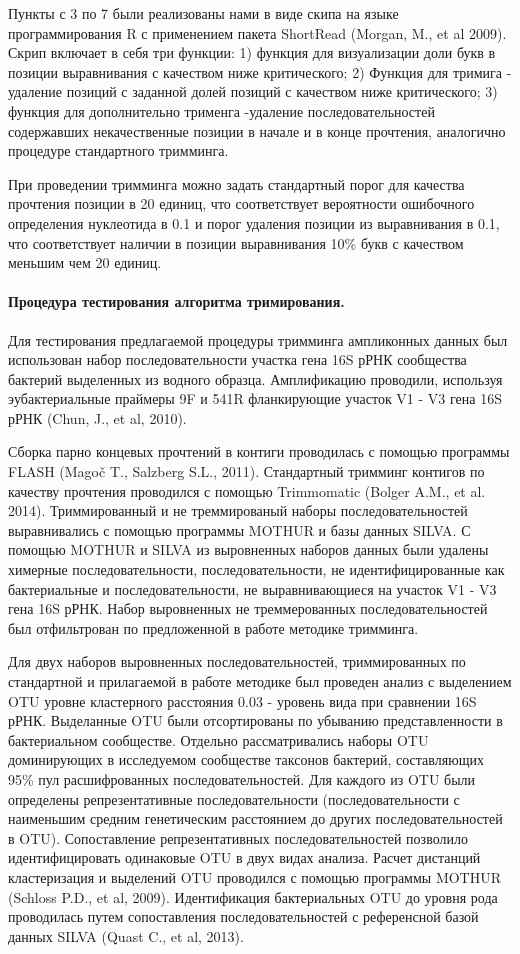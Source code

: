 \documentclass[a4paper,12pt,openany,final]{extreport}
\begin{document}
Пункты с 3 по 7 были реализованы нами в виде скипа на языке
программирования R с применением пакета ShortRead (Morgan, M., et al
2009). Скрип включает в себя три функции: 1) функция для визуализации
доли букв в позиции выравнивания с качеством ниже критического; 2)
Функция для тримига - удаление позиций с заданной долей позиций с
качеством ниже критического; 3) функция для дополнительно трименга
-удаление последовательностей содержавших некачественные позиции в
начале и в конце прочтения, аналогично процедуре стандартного тримминга.

При проведении тримминга можно задать стандартный порог для качества
прочтения позиции в 20 единиц, что соответствует вероятности ошибочного
определения нуклеотида в 0.1 и порог удаления позиции из выравнивания в
0.1, что соответствует наличии в позиции выравнивания 10\% букв с
качеством меньшим чем 20 единиц.

\paragraph{Процедура тестирования алгоритма тримирования.} Для
тестирования предлагаемой процедуры тримминга ампликонных данных был
использован набор последовательности участка гена 16S рРНК сообщества
бактерий выделенных из водного образца. Амплификацию проводили,
используя эубактериальные праймеры 9F и 541R фланкирующие участок V1 -
V3 гена 16S рРНК (Chun, J., et al, 2010).

Сборка парно концевых прочтений в контиги проводилась с помощью
программы FLASH (Magoč T., Salzberg S.L., 2011). Стандартный тримминг
контигов по качеству прочтения проводился с помощью Trimmomatic (Bolger
A.M., et al. 2014). Триммированный и не треммированый наборы
последовательностей выравнивались с помощью программы MOTHUR и базы
данных SILVA. С помощью MOTHUR и SILVA из выровненных наборов данных
были удалены химерные последовательности, последовательности, не
идентифицированные как бактериальные и последовательности, не
выравнивающиеся на участок V1 - V3 гена 16S рРНК. Набор выровненных не
треммерованных последовательностей был отфильтрован по предложенной в
работе методике тримминга.

Для двух наборов выровненных последовательностей, триммированных по
стандартной и прилагаемой в работе методике был проведен анализ с
выделением OTU уровне кластерного расстояния 0.03 - уровень вида при
сравнении 16S рРНК. Выделанные OTU были отсортированы по убыванию
представленности в бактериальном сообществе. Отдельно рассматривались
наборы OTU доминирующих в исследуемом сообществе таксонов бактерий,
составляющих 95\% пул расшифрованных последовательностей. Для каждого из
OTU были определены репрезентативные последовательности
(последовательности с наименьшим средним генетическим расстоянием до
других последовательностей в OTU). Сопоставление репрезентативных
последовательностей позволило идентифицировать одинаковые OTU в двух
видах анализа. Расчет дистанций кластеризация и выделений OTU проводился
с помощью программы MOTHUR (Schloss P.D., et al, 2009). Идентификация
бактериальных OTU до уровня рода проводилась путем сопоставления
последовательностей с референсной базой данных SILVA (Quast C., et al,
2013).
\end{document}
